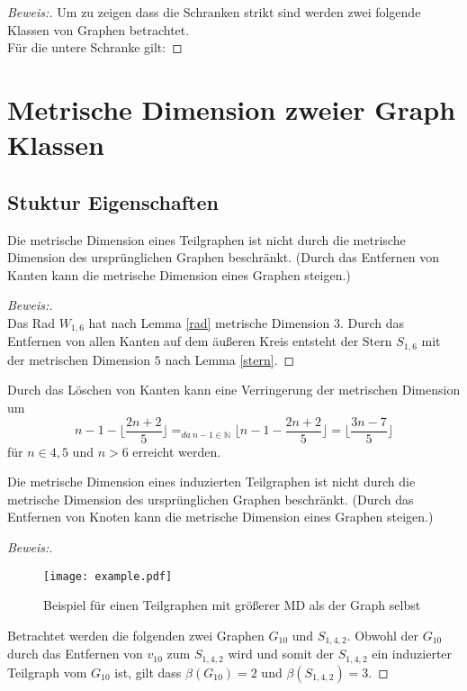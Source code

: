 \begin{proof}[Beweis:] 
Um zu zeigen dass die Schranken strikt sind werden zwei folgende Klassen von Graphen betrachtet.\\
Für die untere Schranke gilt:
\end{proof}
\section{Metrische Dimension zweier Graph Klassen}
\subsection{Stuktur Eigenschaften}
\begin{lem}
Die metrische Dimension eines Teilgraphen ist nicht durch die metrische Dimension des ursprünglichen Graphen beschränkt. (Durch das Entfernen von Kanten kann die metrische Dimension eines Graphen steigen.)
\end{lem}
\begin{proof}[Beweis:]$\;$\\
Das Rad $W_{1,6}$ hat nach Lemma \ref{rad} metrische Dimension $3$. Durch das Entfernen von allen Kanten auf dem äußeren Kreis entsteht der Stern $S_{1,6}$ mit der metrischen Dimension $5$ nach Lemma \ref{stern}.
\end{proof}
Durch das Löschen von Kanten kann eine Verringerung der metrischen Dimension um $$n-1-\lfloor \dfrac{2n+2}{5} \rfloor=_{da \:n-1 \in \mathbb{N}}\lfloor n-1- \dfrac{2n+2}{5} \rfloor=\lfloor \dfrac{3n-7}{5} \rfloor$$ für $n \in {4,5}$ und $n > 6$ erreicht werden.
\begin{lem}
Die metrische Dimension eines induzierten Teilgraphen ist nicht durch die metrische Dimension des ursprünglichen Graphen beschränkt. (Durch das Entfernen von Knoten kann die metrische Dimension eines Graphen steigen.)
\end{lem}
\begin{proof}[Beweis:]$\;$\\

\begin{figure}[h!]
		\centering 		 
\texttt{[image: example.pdf]}
   \caption{Beispiel für einen Teilgraphen mit größerer MD als der Graph selbst}
  	 \end{figure}
  	 Betrachtet werden die folgenden zwei Graphen $G_{10}$ und $S_{1,4,2}$.
Obwohl der $G_{10}$ durch das Entfernen von $v_{10}$ zum $S_{1,4,2}$ wird und somit der $S_{1,4,2}$ ein induzierter Teilgraph vom $G_{10}$ ist, gilt dass $\beta(G_{10})=2$ und $\beta(S_{1,4,2})=3$.
\end{proof}
